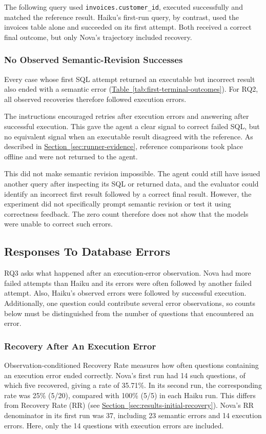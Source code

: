 The following query used \texttt{invoices.customer\_id}, 
executed successfully and matched the reference result. 
Haiku's first-run query, by contrast, used the invoices table alone and
succeeded on its first attempt. 
Both received a correct final outcome,
but only Nova's trajectory included recovery.

\subsubsection{No Observed Semantic-Revision Successes}
Every case whose first SQL attempt returned an executable but incorrect
result also ended with a semantic error
(\hyperref[tab:first-terminal-outcomes]{Table~\ref*{tab:first-terminal-outcomes}}).
For RQ2, all observed recoveries therefore followed execution errors.

The instructions encouraged retries after execution errors and answering
after successful execution. This gave the agent a clear signal to correct
failed SQL, but no equivalent signal when an executable result disagreed
with the reference. As described in
\hyperref[sec:runner-evidence]{Section~\ref*{sec:runner-evidence}},
reference comparisons took place offline and were not returned to the agent.

This did not make semantic revision impossible. The agent could still
have issued another query after inspecting its SQL or returned data,
and the evaluator could identify an incorrect first result followed by
a correct final result. However, the experiment did not specifically
prompt semantic revision or test it using correctness feedback.
The zero count therefore does not show that the models were unable
to correct such errors.

\subsection{Responses To Database Errors}
\label{sec:results-error-responses}

RQ3 asks what happened after an execution-error observation. 
Nova had more failed attempts than Haiku and its errors were often followed by another failed attempt.
Also, Haiku's observed errors were followed by successful execution. 
Additionally, one question could contribute several error
observations, so counts below must be distinguished from the number of
questions that encountered an error.

\subsubsection{Recovery After An Execution Error}
Observation-conditioned Recovery Rate measures how often questions containing
an execution error ended correctly. Nova's first run had
14 such questions, of which five recovered, giving a rate of 35.71\%.
In its second run, the corresponding rate was 25\% (5/20), compared with
100\% (5/5) in each Haiku run.
This differs from Recovery Rate (RR)
(see \hyperref[sec:results-initial-recovery]{Section~\ref*{sec:results-initial-recovery}}).
Nova's RR denominator in its first run was 37, including 23 semantic errors
and 14 execution errors. 
Here, only the 14 questions with execution errors are included. 

